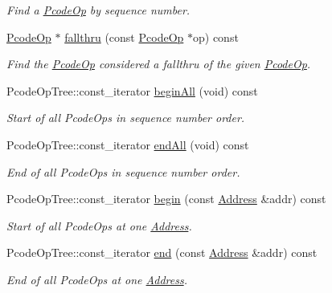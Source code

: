 \begin{DoxyCompactItemize}
\begin{DoxyCompactList}\small\item\em Find a \mbox{\hyperlink{class_pcode_op}{Pcode\+Op}} by sequence number. \end{DoxyCompactList}\item 
\mbox{\hyperlink{class_pcode_op}{Pcode\+Op}} $\ast$ \mbox{\hyperlink{class_pcode_op_bank_a3635f3c0e2910ce4d0af3eae0b6da22c}{fallthru}} (const \mbox{\hyperlink{class_pcode_op}{Pcode\+Op}} $\ast$op) const
\begin{DoxyCompactList}\small\item\em Find the \mbox{\hyperlink{class_pcode_op}{Pcode\+Op}} considered a {\itshape fallthru} of the given \mbox{\hyperlink{class_pcode_op}{Pcode\+Op}}. \end{DoxyCompactList}\item 
Pcode\+Op\+Tree\+::const\+\_\+iterator \mbox{\hyperlink{class_pcode_op_bank_ad92b658064cce0c096d1d2d2e19547b1}{begin\+All}} (void) const
\begin{DoxyCompactList}\small\item\em Start of all Pcode\+Ops in sequence number order. \end{DoxyCompactList}\item 
Pcode\+Op\+Tree\+::const\+\_\+iterator \mbox{\hyperlink{class_pcode_op_bank_aa651dcad6047a32b0e46423f96c80016}{end\+All}} (void) const
\begin{DoxyCompactList}\small\item\em End of all Pcode\+Ops in sequence number order. \end{DoxyCompactList}\item 
Pcode\+Op\+Tree\+::const\+\_\+iterator \mbox{\hyperlink{class_pcode_op_bank_aa5c89c7f2fbad97596cef0e46b4f3a8e}{begin}} (const \mbox{\hyperlink{class_address}{Address}} \&addr) const
\begin{DoxyCompactList}\small\item\em Start of all Pcode\+Ops at one \mbox{\hyperlink{class_address}{Address}}. \end{DoxyCompactList}\item 
Pcode\+Op\+Tree\+::const\+\_\+iterator \mbox{\hyperlink{class_pcode_op_bank_a5275bd8fcaaed9b6c3f00a3301a63d52}{end}} (const \mbox{\hyperlink{class_address}{Address}} \&addr) const
\begin{DoxyCompactList}\small\item\em End of all Pcode\+Ops at one \mbox{\hyperlink{class_address}{Address}}. \end{DoxyCompactList}\item 

\end{DoxyCompactItemize}
